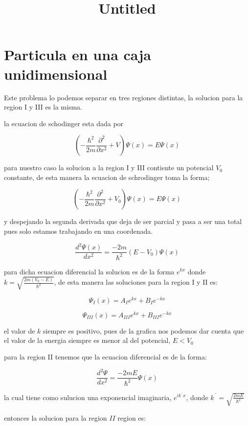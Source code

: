 \documentclass[11pt]{article}
\title{Untitled}
\begin{document}
    
    \maketitle
    
    

    
    \hypertarget{particula-en-una-caja-unidimensional}{%
\section{Particula en una caja
unidimensional}\label{particula-en-una-caja-unidimensional}}

    Este problema lo podemos separar en tres regiones distintas, la solucion
para la region I y III es la misma.

la ecuacion de schodinger esta dada por

\[\left(-\frac{\hbar ^2}{2m}\frac{\partial ^2}{\partial x^2}+V\right)\Psi (x)=E\Psi (x)\]

para nuestro caso la solucion a la region I y III contiente un potencial
\(V_0\) constante, de esta manera la ecuacion de schrodinger toma la
forma;

\[\left(-\frac{\hbar ^2}{2m}\frac{\partial ^2}{\partial x^2}+V_0\right)\Psi (x)=E\Psi (x)\]

y despejando la segunda derivada que deja de ser parcial y pasa a ser
una total pues solo estamos trabajando en una coordenada.

\[\frac{d^2\Psi (x)}{dx^2}=\frac{-2m}{\hbar ^2}(E-V_0)\Psi (x)\]

para dicha ecuacion diferencial la solucion es de la forma \(e^{kx}\)
donde \(k=\sqrt{\frac{2m(V_0-E)}{\hbar ^2}}\), de esta manera las
soluciones para la region I y II es:

\[\Psi _I(x)=A_Ie^{kx}+B_Ie^{-kx}\]

\[\Psi _{III}(x)=A_{III}e^{kx}+B_{III}e^{-kx}\]

el valor de \(k\) siempre es positivo, pues de la grafica nos podemos
dar cuenta que el valor de la energia siempre es menor al del potencial,
\(E<V_0\)

para la region II tenemos que la ecuacion diferencial es de la forma:

\[\frac{d^2\Psi}{dx^2}=\frac{-2mE}{\hbar ^2}\Psi (x)\]

la cual tiene como sulucion una exponencial imaginaria, \(e^{ik^´x}\),
donde \(k^´=\sqrt{\frac{2mE}{\hbar ^2}}\)

entonces la solucion para la region \(II\) region es:
\end{document}
